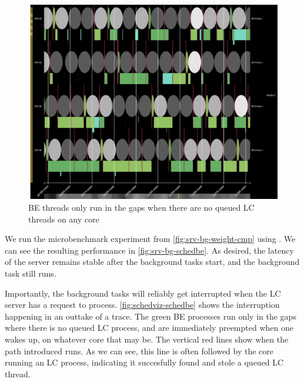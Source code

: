 \begin{figure}[t]
    \centering
    \includegraphics[width=\columnwidth]{graphs/schedviz-schedbe.png}
    \caption{BE threads only run in the gaps when there are no queued LC threads
    on any core }\label{fig:schedviz-schedbe}
\end{figure}

We run the microbenchmark experiment from \autoref{fig:srv-bg-weight-cmp} using
\beclass{}. We can see the resulting performance in
\autoref{fig:srv-bg-schedbe}. As desired, the latency of the server remains
stable after the background tasks start, and the background task still runs. 

Importantly, the background tasks will reliably get interrupted when the LC
server has a request to process. \autoref{fig:schedviz-schedbe} shows the
interruption happening in an outtake of a trace. The green BE processes run only
in the gaps where there is no queued LC process, and are immediately preempted
when one wakes up, on whatever core that may be. The vertical red lines show
when the \exit{} path \beclass{} introduced runs. As we can see, this line is
often followed by the core running an LC process, indicating it succesfully
found and stole a queued LC thread.

